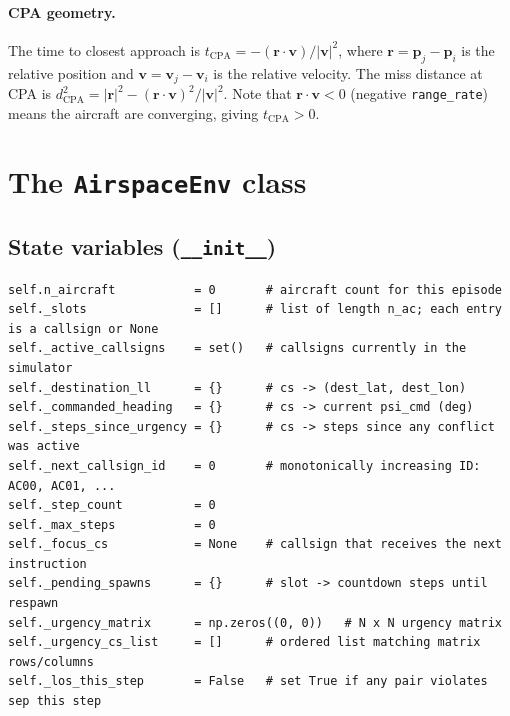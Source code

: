 \documentclass[11pt, a4paper]{article}
\begin{document}
\paragraph{CPA geometry.}
The time to closest approach is $t_\text{CPA} = -(\mathbf{r} \cdot \mathbf{v}) /
|\mathbf{v}|^2$, where $\mathbf{r} = \mathbf{p}_j - \mathbf{p}_i$ is the relative
position and $\mathbf{v} = \mathbf{v}_j - \mathbf{v}_i$ is the relative velocity.
The miss distance at CPA is
$d_\text{CPA}^2 = |\mathbf{r}|^2 - (\mathbf{r} \cdot \mathbf{v})^2 / |\mathbf{v}|^2$.
Note that $\mathbf{r} \cdot \mathbf{v} < 0$ (negative \texttt{range\_rate}) means
the aircraft are converging, giving $t_\text{CPA} > 0$.

\section{The \texttt{AirspaceEnv} class}

\subsection{State variables (\texttt{\_\_init\_\_})}

\begin{lstlisting}[caption={Instance variables initialised in \texttt{\_\_init\_\_}.}]
self.n_aircraft           = 0       # aircraft count for this episode
self._slots               = []      # list of length n_ac; each entry is a callsign or None
self._active_callsigns    = set()   # callsigns currently in the simulator
self._destination_ll      = {}      # cs -> (dest_lat, dest_lon)
self._commanded_heading   = {}      # cs -> current psi_cmd (deg)
self._steps_since_urgency = {}      # cs -> steps since any conflict was active
self._next_callsign_id    = 0       # monotonically increasing ID: AC00, AC01, ...
self._step_count          = 0
self._max_steps           = 0
self._focus_cs            = None    # callsign that receives the next instruction
self._pending_spawns      = {}      # slot -> countdown steps until respawn
self._urgency_matrix      = np.zeros((0, 0))   # N x N urgency matrix
self._urgency_cs_list     = []      # ordered list matching matrix rows/columns
self._los_this_step       = False   # set True if any pair violates sep this step
\end{lstlisting}
\end{document}
